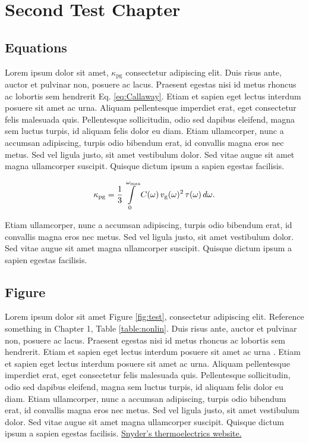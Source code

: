 \chapter{Second Test Chapter}

\section{Equations}
Lorem ipsum dolor sit amet, $\kappa_\mathrm{pg}$
consectetur adipiscing elit. Duis risus ante, auctor et pulvinar non, posuere ac lacus. Praesent egestas nisi id metus rhoncus ac lobortis sem hendrerit Eq. \ref{eq:Callaway}. Etiam et sapien eget lectus interdum posuere sit amet ac urna. Aliquam pellentesque imperdiet erat, eget consectetur felis malesuada quis. Pellentesque sollicitudin, odio sed dapibus eleifend, magna sem luctus turpis, id aliquam felis dolor eu diam. Etiam ullamcorper, nunc a accumsan adipiscing, turpis odio bibendum erat, id convallis magna eros nec metus. Sed vel ligula justo, sit amet vestibulum dolor. Sed vitae augue sit amet magna ullamcorper suscipit. Quisque dictum ipsum a sapien egestas facilisis. 

\begin{equation}
  \kappa_\mathrm{pg}=\frac{1}{3} \intop _0 ^{\omega_\mathrm{max}} C(\omega) \, v_\mathrm{g}(\omega)^2 \, \tau(\omega) \, d\omega. \label{eq:Callaway}
\end{equation}

Etiam ullamcorper, nunc a accumsan adipiscing, turpis odio bibendum erat, id convallis magna eros nec metus. Sed vel ligula justo, sit amet vestibulum dolor. Sed vitae augue sit amet magna ullamcorper suscipit. Quisque dictum ipsum a sapien egestas facilisis. 



\section{Figure}
\noindent Lorem ipsum dolor sit amet Figure \ref{fig:test}, consectetur adipiscing elit. Reference something in Chapter 1, Table \ref{table:nonlin}. Duis risus ante, auctor et pulvinar non, posuere ac lacus. Praesent egestas nisi id metus rhoncus ac lobortis sem hendrerit. Etiam et sapien eget lectus interdum posuere sit amet ac urna \citep{latex:companion}. Etiam et sapien eget lectus interdum posuere sit amet ac urna. Aliquam pellentesque imperdiet erat, eget consectetur felis malesuada quis. Pellentesque sollicitudin, odio sed dapibus eleifend, magna sem luctus turpis, id aliquam felis dolor eu diam. Etiam ullamcorper, nunc a accumsan adipiscing, turpis odio bibendum erat, id convallis magna eros nec metus. Sed vel ligula justo, sit amet vestibulum dolor. Sed vitae augue sit amet magna ullamcorper suscipit. Quisque dictum ipsum a sapien egestas facilisis. \href{http://thermoelectrics.matsci.northwestern.edu/}{Snyder's thermoelectrics website.}

